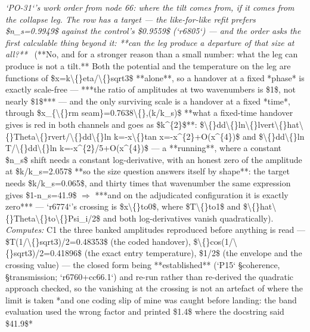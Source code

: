 \begin{description}
\textit{`PO-31`'s work order from node 66: where the tilt comes from, if it comes from the collapse leg. The row has a target --- the like-for-like refit prefers \$n\_s=0.9949\$ against the control's \$0.9559\$ (`r6805`) --- and the order asks the first calculable thing beyond it: **can the leg produce a departure of that size at all?**} \ (**No, and for a stronger reason than a small number: what the leg can produce is not a tilt.** Both the potential and the temperature on the leg are functions of \$x=k\textbackslash\{\}eta/\textbackslash\{\}sqrt3\$ **alone**, so a handover at a fixed *phase* is exactly scale-free --- ***the ratio of amplitudes at two wavenumbers is \$1\$, not nearly \$1\$*** --- and the only surviving scale is a handover at a fixed *time*, through \$x\_\{\textbackslash\{\}rm seam\}=0.7638\textbackslash\{\},(k/k\_s)\$  **what a fixed-time handover gives is red in both channels and goes as \$k\textasciicircum{}\{2\}\$**: \$\textbackslash\{\}dd\textbackslash\{\}ln\textbackslash\{\}lvert\textbackslash\{\}hat\textbackslash\{\}Theta\textbackslash\{\}rvert/\textbackslash\{\}dd\textbackslash\{\}ln k=-x\textbackslash\{\}tan x=-x\textasciicircum{}\{2\}+O(x\textasciicircum{}\{4\})\$ and \$\textbackslash\{\}dd\textbackslash\{\}ln T/\textbackslash\{\}dd\textbackslash\{\}ln k=-x\textasciicircum{}\{2\}/5+O(x\textasciicircum{}\{4\})\$ --- a **running**, where a constant \$n\_s\$ shift needs a constant log-derivative, with an honest zero of the amplitude at \$k/k\_s=2.057\$   **so the size question answers itself by shape**: the target needs \$k/k\_s=0.065\$, and thirty times that wavenumber the same expression gives \$1-n\_s=41.9\$ \ensuremath{\Rightarrow} ***and on the adjudicated configuration it is exactly zero*** --- `r6774`'s crossing is \$x\textbackslash\{\}to0\$, where \$T\textbackslash\{\}to1\$ and \$\textbackslash\{\}hat\textbackslash\{\}Theta\textbackslash\{\}to\textbackslash\{\}Psi\_i/2\$ and both log-derivatives vanish quadratically). 
\emph{Computes:} C1 the three banked amplitudes reproduced before anything is read --- \$T(1/\textbackslash\{\}sqrt3)/2=0.48353\$ (the coded handover), \$\textbackslash\{\}cos(1/\textbackslash\{\}sqrt3)/2=0.41896\$ (the exact entry temperature), \$1/2\$ (the envelope and the crossing value) --- the closed form being **established** (`P15` \S{}coherence, \S{}transmission; `r6760+cc66.1`) and re-run rather than re-derived  the quadratic approach checked, so the vanishing at the crossing is not an artefact of where the limit is taken  *and one coding slip of mine was caught before landing: the band evaluation used the wrong factor and printed \$1.4\$ where the docstring said \$41.9\$*

\end{description}
